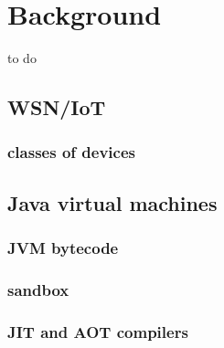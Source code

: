 \chapter{Background}
to do

\section{WSN/IoT}
\subsection{classes of devices}
\section{Java virtual machines}
\subsection{JVM bytecode}
\subsection{sandbox}
\subsection{JIT and AOT compilers}


